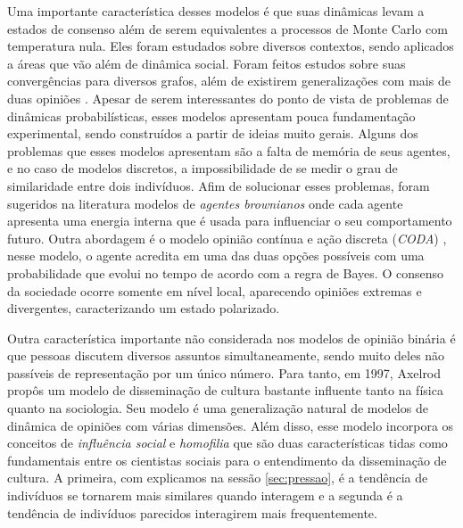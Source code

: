 Uma importante característica desses modelos é que suas dinâmicas levam
a estados de consenso além de serem equivalentes a processos de Monte
Carlo com temperatura nula. Eles foram estudados sobre diversos contextos,
sendo aplicados a áreas que vão além de dinâmica social. Foram feitos
estudos sobre suas convergências para diversos grafos, além de existirem
generalizações com mais de duas opiniões \citep{Castellano2009}. Apesar
de serem interessantes do ponto de vista de problemas de dinâmicas
probabilísticas, esses modelos apresentam pouca fundamentação experimental,
sendo construídos a partir de ideias muito gerais. Alguns dos problemas que
esses modelos apresentam são a falta de memória de seus agentes, e no caso
de modelos discretos, a impossibilidade de se medir o grau de similaridade
entre dois indivíduos. Afim de solucionar esses problemas, foram sugeridos
na literatura modelos de \textit{agentes brownianos} \cite{Schweitzer2000}
onde cada agente apresenta uma energia interna que é usada para influenciar
o seu comportamento futuro. Outra abordagem é o modelo opinião contínua
e ação discreta (\textit{CODA}) \cite{Martins2008}, nesse modelo, o
agente acredita em uma das duas opções possíveis com uma probabilidade
que evolui no tempo de acordo com a regra de Bayes. O consenso da sociedade
ocorre somente em nível local, aparecendo opiniões extremas e divergentes,
caracterizando um estado polarizado.

Outra característica importante não considerada nos modelos de opinião
binária é que pessoas discutem diversos assuntos simultaneamente,
sendo muito deles não passíveis de representação por um único
número. Para tanto, em 1997, Axelrod propôs um modelo de disseminação
de cultura \cite{Axelrod1997}  bastante influente tanto na física quanto na
sociologia. Seu modelo é uma generalização natural de modelos de dinâmica
de opiniões com várias dimensões. Além disso, esse modelo incorpora os
conceitos de \textit{influência social} e \textit{homofilia} que são duas
características tidas como fundamentais entre os cientistas sociais para
o entendimento da disseminação de cultura. A primeira, com explicamos
na sessão \ref{sec:pressao}, é a tendência de indivíduos se tornarem
mais similares quando interagem e a segunda é a tendência de indivíduos
parecidos interagirem mais frequentemente.

